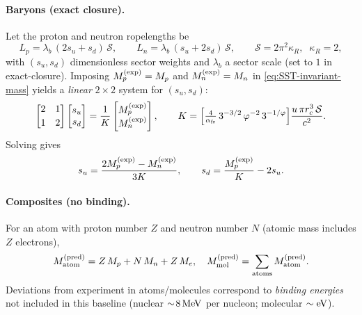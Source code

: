 \documentclass[11pt]{article}
\begin{document}
        \paragraph{Baryons (exact closure).}
            Let the proton and neutron ropelengths be
            \[
                L_p=\lambda_b\,(2s_u+s_d)\,\mathcal S,\qquad
                L_n=\lambda_b\,(s_u+2s_d)\,\mathcal S,\qquad
                \mathcal S=2\pi^2\kappa_R,\;\;\kappa_R=2,
            \]
            with $(s_u,s_d)$ dimensionless sector weights and $\lambda_b$ a sector scale (set to $1$ in exact-closure).
            Imposing $M_p^{\rm(exp)}=M_p$ and $M_n^{\rm(exp)}=M_n$ in \eqref{eq:SST-invariant-mass} yields a \emph{linear} $2\times2$ system for $(s_u,s_d)$:
            \[
                \begin{bmatrix}
                2 & 1\\[2pt]
                1 & 2
                \end{bmatrix}
                \begin{bmatrix}
                s_u\\ s_d
                \end{bmatrix}
                =
                \frac{1}{K}
                \begin{bmatrix}
                M_p^{\rm(exp)}\\ M_n^{\rm(exp)}
                \end{bmatrix},
                \qquad
                K=\Big[\tfrac{4}{\alpha_{\rm fs}}\,3^{-3/2}\,\varphi^{-2}\,3^{-1/\varphi}\Big]\frac{u\,\pi r_c^3\,\mathcal S}{c^2}.
            \]
            Solving gives
            \[
                s_u=\frac{2M_p^{\rm(exp)}-M_n^{\rm(exp)}}{3K},
                \qquad
                s_d=\frac{M_p^{\rm(exp)}}{K}-2s_u.
            \]

        \paragraph{Composites (no binding).}
            For an atom with proton number $Z$ and neutron number $N$ (atomic mass includes $Z$ electrons),
            \[
                M_{\rm atom}^{(\rm pred)} = Z\,M_p+N\,M_n+Z\,M_e,\quad
                M_{\rm mol}^{(\rm pred)}=\sum_{\text{atoms}}M_{\rm atom}^{(\rm pred)}.
            \]
            Deviations from experiment in atoms/molecules correspond to \emph{binding energies} not included in this baseline (nuclear $\sim\!8\,{\rm MeV}$ per nucleon; molecular $\sim{\rm eV}$).
\end{document}
